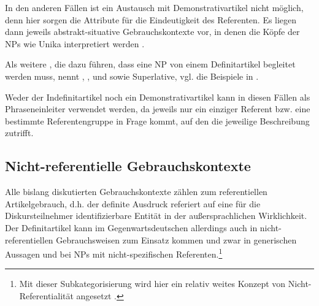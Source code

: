 \begin{exe}
	\ex \label{ex:bill}  
\end{exe}

In den anderen Fällen ist ein Austausch mit Demonstrativartikel nicht möglich, denn hier sorgen die Attribute für die Eindeutigkeit des Referenten. Es liegen dann jeweils abstrakt-situative Gebrauchskontexte vor, in denen die Köpfe der NPs wie Unika interpretiert werden  \parencite[38]{Himmelmann1997}. 

Als weitere , die dazu führen, dass eine NP von einem Definitartikel begleitet werden muss, nennt  \textcite[148,228ff.]{Hawkins1978} , ,  und  sowie Superlative, vgl. die Beispiele in  \parencite[vgl. auch][9]{Lyons1999}.

 \begin{exe}
	\ex \label{ex:mod}   
	\begin{xlist}
		\ex \label{ex:same} 
		\ex \label{ex:only}    
		\ex \label{ex:next}  
		\ex \label{ex:first}   
		\ex \label{ex:super} 
		\end{xlist}
\end{exe}

Weder der Indefinitartikel noch ein Demonstrativartikel kann in diesen Fällen als Phraseneinleiter verwendet werden, da jeweils nur ein einziger Referent bzw. eine bestimmte Referentengruppe in Frage kommt, auf den die jeweilige Beschreibung zutrifft.  

\subsection{Nicht-referentielle Gebrauchskontexte}\label{sec:nicht-referentiell}

Alle bislang diskutierten Gebrauchskontexte zählen zum referentiellen Artikelgebrauch, d.h. der definite Ausdruck referiert auf eine für die Diskursteilnehmer identifizierbare Entität in der außersprachlichen Wirklichkeit.
Der Definitartikel kann im Gegenwartsdeutschen allerdings auch in nicht-referentiellen Gebrauchsweisen zum Einsatz kommen und zwar in generischen Aussagen und bei NPs mit nicht-spezifischen Referenten.\footnote{Mit dieser Subkategorisierung wird hier ein relativ weites Konzept von Nicht-Referentialität  angesetzt \parencite[zur Abgrenzungsdiskussion von Definitheit, Spezifizität und Referentialität vgl. u.a.][]{Bisle-Muller1991,Lyons1999,Studler2011,vonHeusinger2011}.} 

